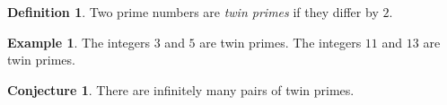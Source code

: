 \documentclass[12pt]{amsart}
\theoremstyle{definition}
\newtheorem*{defn}{Definition}
\newtheorem*{example}{Example}
\theoremstyle{theorem}
\newtheorem{conjecture}[thm]{Conjecture}
\begin{document}
\begin{defn}
Two prime numbers are {\em twin primes} if they differ by $2$.
\end{defn}

\begin{example}
The integers $3$ and $5$ are twin primes.  The integers $11$ and $13$ are twin primes.
\end{example}

\begin{conjecture}
There are infinitely many pairs of twin primes.
\end{conjecture}


 
\end{document}
